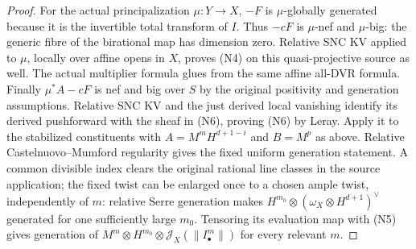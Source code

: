 \begin{proof}
For the actual principalization $\mu:Y\to X$, $-F$ is $\mu$-globally
generated because it is the invertible total transform of $I$.
Thus $-cF$ is $\mu$-nef and $\mu$-big: the generic fibre of the
birational map has dimension zero.  Relative SNC KV applied to
$\mu$, locally over affine opens in $X$, proves (N4) on this
quasi-projective source as well.  The actual multiplier formula
glues from the same affine all-DVR formula.  Finally
$\mu^*A-cF$ is nef and big over $S$ by the original positivity
and generation assumptions.  Relative SNC KV and the just derived
local vanishing identify its derived pushforward with the sheaf
in (N6), proving (N6) by Leray.  Apply it to the stabilized
constituents with $A=M^mH^{d+1-i}$ and $B=M^p$ as above.
Relative Castelnuovo--Mumford regularity gives the fixed uniform
generation statement.  A common divisible index clears the
original rational line classes in the source application; the
fixed twist can be enlarged once to a chosen ample twist,
independently of $m$: relative Serre generation makes
$H^{m_0}\otimes(\omega_X\otimes H^{d+1})^\vee$ generated for one
sufficiently large $m_0$.  Tensoring its evaluation map with (N5)
gives generation of $M^m\otimes H^{m_0}\otimes\mathcal J_X(\|I_\bullet^m\|)$
for every relevant $m$.
\end{proof}

